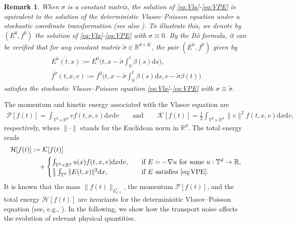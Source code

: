 \documentclass[11pt,reqno]{amsproc}
\newtheorem{remark}[Def]{Remark}
\newcommand{\ud}{\mathrm d}
\newcommand{\R}{\mathbb{R}}
\numberwithin{equation}{section}
\begin{document}
\begin{remark}\label{rem1}
When $\sigma$ is a constant matrix,
the solution of \eqref{eq:Vla}-\eqref{eq:VPE} is equivalent to the solution of the deterministic Vlasov--Poisson equation under a stochastic coordinate transformation  (see also \cite{DFV14}). To illustrate this, we denote by $(E^{0},f^{0})$ the solution of \eqref{eq:Vla}-\eqref{eq:VPE} with $\sigma\equiv0$.
By the It\^o formula, it can be verified that for any constant matrix $\tilde{\sigma}\in\R^{d\times K}$, the pair $(E^{\tilde{\sigma}},f^{\tilde{\sigma}})$ given by
\begin{gather*}
E^{\tilde{\sigma}}(t,x):=E^{0}\Big(t,x-\tilde{\sigma}\int_0^t \beta(s)\ud s\Big),\\
f^{\tilde{\sigma}}(t,x,v):=f^0\Big(t,x-\tilde{\sigma}\int_0^t \beta(s)\ud s,v-\tilde{\sigma} \beta(t)\Big)
\end{gather*}
satisfies the stochastic Vlasov--Poisson equation \eqref{eq:Vla}-\eqref{eq:VPE} with $\sigma\equiv\tilde\sigma$. 
\end{remark}




The momentum and kinetic energy associated with the Vlasov equation are 
\begin{gather*}
\mathcal{P}[f(t)]=\int_{\mathbb{T}^d\times\mathbb{R}^d}vf(t,x,v)\ud x\ud v\qquad\text{and}\qquad
\mathcal{K}[f(t)]=\frac12\int_{\mathbb{T}^d\times\mathbb{R}^d}\|v\|^2f(t,x,v)\ud x\ud v,
\end{gather*}
respectively, where $\|\cdot\|$ stands for the Euclidean norm in $\R^d$. The total energy reads
\begin{align}\label{eq:DefHF}
\mathcal H[f(t)]&:= \mathcal{K}[f(t)]\\
&\quad+\begin{cases}
\int_{\mathbb{T}^d\times\R^d}u(x)f(t,x,v)\ud x\ud v,\quad &\text{if } E=-\nabla u\text{ for some } u:\mathbb{T}^d\to\R,\\\notag
\frac{1}{2}\int_{\mathbb{T}^d}\|E(t,x)\|^2\ud x,\quad &\text{if } E \text{ satisfies } \eqref{eq:VPE}.
\end{cases}
\end{align}
It is known that the mass $\|f(t)\|_{L^1_{x,v}}$, the momentum $\mathcal{P}[f(t)]$,
and the total energy $\mathcal H[f(t)]$
are invariants for the determinisitic Vlasov--Poisson equation
(see, e.g., \cite{GHS22}). In the following, we show how the transport noise affects the evolution of relevant physical quantities.
\end{document}
